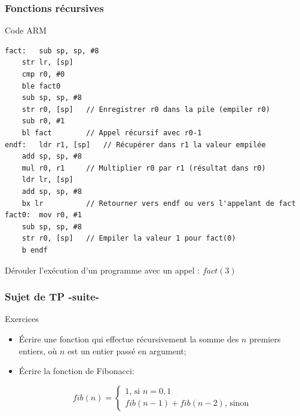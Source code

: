 \documentclass{beamer}
\begin{document}
\begin{frame}[fragile]
\frametitle{Fonctions récursives}
\vspace{-1cm}
\begin{block}{Code ARM}
  \vspace{-.2cm}
{\small
\begin{lstlisting}[style=arm]
fact:	sub sp, sp, #8
	str lr, [sp]
	cmp r0, #0
	ble fact0
	sub sp, sp, #8 
	str r0, [sp]   // Enregistrer r0 dans la pile (empiler r0)
	sub r0, #1     
	bl fact        // Appel récursif avec r0-1
endf:	ldr r1, [sp]   // Récupérer dans r1 la valeur empilée
	add sp, sp, #8
	mul r0, r1     // Multiplier r0 par r1 (résultat dans r0)
	ldr lr, [sp]
	add sp, sp, #8
	bx lr          // Retourner vers endf ou vers l'appelant de fact
fact0:	mov r0, #1     
	sub sp, sp, #8
	str r0, [sp]   // Empiler la valeur 1 pour fact(0)
	b endf
      \end{lstlisting}}
    Dérouler l'exécution d'un programme avec un appel : $fact(3)$
\end{block}
\end{frame}

\begin{frame}[fragile]
\frametitle{Sujet de TP -suite-}

\begin{block}{Exercices}
\begin{itemize}
\item Écrire une fonction qui effectue récursivement la somme des $n$
  premiers entiers, où $n$ est un entier passé en argument;

\item Écrire la fonction de Fibonacci:

$$fib(n)=
\left\{
\begin{array}{l}
1\mbox{, si }n=0,1\\
fib(n-1)+fib(n-2)\mbox{, sinon}
\end{array}
\right.$$
\end{itemize}
\end{block}
\end{frame}



\end{document}
